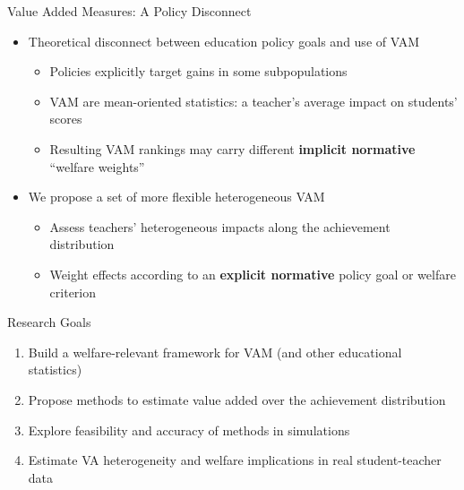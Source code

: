 \documentclass[11pt]{beamer}
\begin{document}
\begin{frame}{Value Added Measures: A Policy Disconnect}

\begin{itemize}
    \item Theoretical disconnect between education policy goals and use of VAM 
    \begin{itemize}
        \item Policies explicitly target gains in some subpopulations
        \item VAM are mean-oriented statistics: a teacher's average impact on students' scores
        \item Resulting VAM rankings may carry different \textbf{implicit normative} ``welfare weights''
    \end{itemize}
    
    \item  We propose a set of more flexible heterogeneous VAM 
    \begin{itemize}
        \item Assess teachers' heterogeneous impacts along the achievement distribution
        \item  Weight effects according to an \textbf{explicit normative} policy goal or welfare criterion
    \end{itemize}
\end{itemize}

\end{frame}



\begin{frame}{Research Goals}

\begin{enumerate}
    \item Build a welfare-relevant framework for VAM (and other educational statistics) 
    \item Propose methods to estimate value added over the achievement distribution
    \item Explore feasibility and accuracy of methods in simulations
    \item Estimate VA heterogeneity and welfare implications in real student-teacher data
\end{enumerate}
\end{frame}




\end{document}
